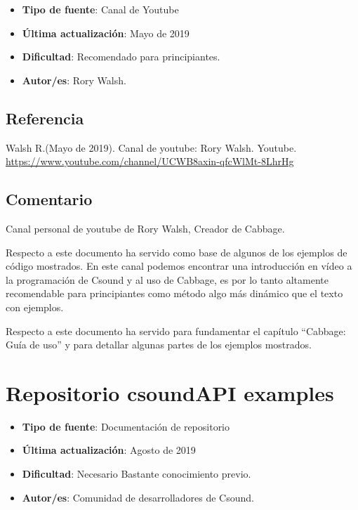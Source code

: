  \begin{itemize}
 \item \textbf{Tipo de fuente}: Canal de Youtube
 
 \item \textbf{Última actualización}: Mayo de 2019
 
 \item \textbf{Dificultad}: Recomendado para principiantes.
 
 \item \textbf{Autor/es}: Rory Walsh.
 \end{itemize}

\subsection{Referencia}

Walsh R.(Mayo de 2019). Canal de youtube: Rory Walsh. Youtube. \url{https://www.youtube.com/channel/UCWB8axin-qfcWlMt-8LhrHg}

\subsection{Comentario}

Canal personal de youtube de Rory Walsh, Creador de Cabbage. 

Respecto a este documento ha servido como base de algunos de los ejemplos de código mostrados. En este canal podemos encontrar una introducción en vídeo a la programación de Csound y al uso de Cabbage, es por lo tanto altamente recomendable para principiantes como método algo más dinámico que el texto con ejemplos.

Respecto a este documento ha servido para fundamentar el capítulo ``Cabbage: Guía de uso'' y para detallar algunas partes de los ejemplos mostrados.

\section{Repositorio csoundAPI examples}

 \begin{itemize}
 \item \textbf{Tipo de fuente}: Documentación de repositorio
 
 \item \textbf{Última actualización}: Agosto de 2019
 
 \item \textbf{Dificultad}: Necesario Bastante conocimiento previo.
 
 \item \textbf{Autor/es}: Comunidad de desarrolladores de Csound.
 \end{itemize}

